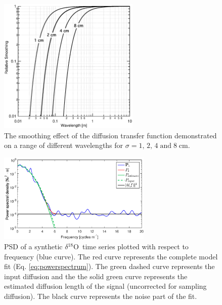 \documentclass[11pt, draftcls, onecolumn]{IEEEtran} %
\numberwithin{equation}{section}
\numberwithin{table}{section}
\numberwithin{figure}{section}
\newcommand{\delOx}{$\delta{}^{18}\mathrm{O}$}
\begin{document}
\begin{figure}[]
	\vspace*{2mm}
	\begin{center}
		\includegraphics[width=0.6\textwidth]{Figure_4}
		\caption{The smoothing effect of the diffusion transfer function demonstrated on 
			a range of different wavelengths for $\sigma = 1,\, 2,\, 4\; \mathrm{and} \;8 \;	\mathrm{cm}$.} 
		\label{fig:transfer_function}
	\end{center}
\end{figure}


\begin{figure}[]	
	\vspace*{2mm}	
	\begin{center}		
		\includegraphics[width=0.65\textwidth]{Figure_5}		
		\caption{PSD of a synthetic \delOx~time series plotted with respect to frequency (blue curve).
				The red curve represents the complete model fit (Eq. \ref{eq:powerspectrum}).
				The green dashed curve represents the input diffusion 
				and the the solid green curve represents the estimated diffusion length
				of the signal (uncorrected for sampling diffusion). The black curve represents the noise part of the fit.}
		\label{fig:synthetic_power_spectra}	
	\end{center}
\end{figure}
\end{document}
